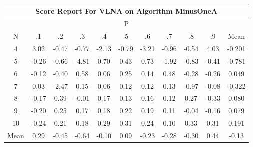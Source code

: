 \documentclass[11pt,a4paper]{report}
\begin{document}
\begin{longtable}{ | c || c | c | c | c | c | c | c | c | c || c |}
\hline
\multicolumn{11}{|c|}{ Score Report For VLNA on Algorithm MinusOneA} \\
\hline
\multicolumn{11}{|c|}{ P } \\
\hline
N & .1 & .2 & .3 & .4 & .5 & .6 & .7 & .8 & .9 & Mean\\
 \hline
 \hline
 \endhead
  4 &  \cellcolor[HTML]{AFAFFF} 3.02 &  \cellcolor[HTML]{FFF7F7} -0.47 &  \cellcolor[HTML]{FFEFEF} -0.77 &  \cellcolor[HTML]{FFC7C7} -2.13 &  \cellcolor[HTML]{FFEFEF} -0.79 &  \cellcolor[HTML]{FFAFAF} -3.21 &  \cellcolor[HTML]{FFE7E7} -0.96 &  \cellcolor[HTML]{FFEFEF} -0.54 &  \cellcolor[HTML]{9797FF} 4.03 & -0.201 \\
  5 &  \cellcolor[HTML]{FFF7F7} -0.26 &  \cellcolor[HTML]{FFEFEF} -0.66 &  \cellcolor[HTML]{FF8787} -4.81 &  \cellcolor[HTML]{EFEFFF} 0.70 &  \cellcolor[HTML]{F7F7FF} 0.43 &  \cellcolor[HTML]{EFEFFF} 0.73 &  \cellcolor[HTML]{FFCFCF} -1.92 &  \cellcolor[HTML]{FFE7E7} -0.83 &  \cellcolor[HTML]{FFF7F7} -0.41 & -0.781 \\
  6 &  \cellcolor[HTML]{FFFFFF} -0.12 &  \cellcolor[HTML]{FFF7F7} -0.40 &  \cellcolor[HTML]{EFEFFF} 0.58 &  \cellcolor[HTML]{FFFFFF} 0.06 &  \cellcolor[HTML]{F7F7FF} 0.25 &  \cellcolor[HTML]{FFFFFF} 0.14 &  \cellcolor[HTML]{EFEFFF} 0.48 &  \cellcolor[HTML]{FFF7F7} -0.28 &  \cellcolor[HTML]{FFF7F7} -0.26 & 0.049 \\
  7 &  \cellcolor[HTML]{FFFFFF} 0.03 &  \cellcolor[HTML]{FFBFBF} -2.47 &  \cellcolor[HTML]{FFFFFF} 0.15 &  \cellcolor[HTML]{FFFFFF} 0.06 &  \cellcolor[HTML]{FFFFFF} 0.12 &  \cellcolor[HTML]{FFFFFF} 0.12 &  \cellcolor[HTML]{FFFFFF} 0.13 &  \cellcolor[HTML]{FFE7E7} -0.97 &  \cellcolor[HTML]{FFFFFF} -0.08 & -0.322 \\
  8 &  \cellcolor[HTML]{FFF7F7} -0.17 &  \cellcolor[HTML]{F7F7FF} 0.39 &  \cellcolor[HTML]{FFFFFF} -0.01 &  \cellcolor[HTML]{F7F7FF} 0.17 &  \cellcolor[HTML]{FFFFFF} 0.13 &  \cellcolor[HTML]{F7F7FF} 0.16 &  \cellcolor[HTML]{FFFFFF} 0.12 &  \cellcolor[HTML]{F7F7FF} 0.27 &  \cellcolor[HTML]{FFF7F7} -0.33 & 0.080 \\
  9 &  \cellcolor[HTML]{FFF7F7} -0.20 &  \cellcolor[HTML]{F7F7FF} 0.25 &  \cellcolor[HTML]{F7F7FF} 0.17 &  \cellcolor[HTML]{F7F7FF} 0.18 &  \cellcolor[HTML]{F7F7FF} 0.22 &  \cellcolor[HTML]{F7F7FF} 0.19 &  \cellcolor[HTML]{FFFFFF} 0.11 &  \cellcolor[HTML]{FFFFFF} -0.04 &  \cellcolor[HTML]{FFF7F7} -0.16 & 0.079 \\
  10 &  \cellcolor[HTML]{FFF7F7} -0.24 &  \cellcolor[HTML]{F7F7FF} 0.21 &  \cellcolor[HTML]{F7F7FF} 0.18 &  \cellcolor[HTML]{F7F7FF} 0.29 &  \cellcolor[HTML]{F7F7FF} 0.31 &  \cellcolor[HTML]{F7F7FF} 0.24 &  \cellcolor[HTML]{FFFFFF} 0.10 &  \cellcolor[HTML]{F7F7FF} 0.33 &  \cellcolor[HTML]{F7F7FF} 0.31 & 0.191 \\
 \hline
 \hline
Mean &  \cellcolor[HTML]{F7F7FF} 0.29 &  \cellcolor[HTML]{FFF7F7} -0.45 &  \cellcolor[HTML]{FFEFEF} -0.64 &  \cellcolor[HTML]{FFFFFF} -0.10 &  \cellcolor[HTML]{FFFFFF} 0.09 &  \cellcolor[HTML]{FFF7F7} -0.23 &  \cellcolor[HTML]{FFF7F7} -0.28 &  \cellcolor[HTML]{FFF7F7} -0.30 &  \cellcolor[HTML]{F7F7FF} 0.44 &  \cellcolor[HTML]{FFFFFF} -0.13
\end{longtable}
\end{document}
